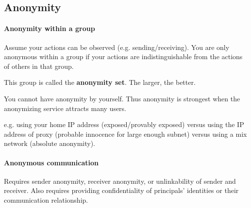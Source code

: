 \subsection{Anonymity}

\paragraph{Anonymity within a group} Assume your actions can be observed (e.g. sending/receiving). You are only anonymous within a group if your actions are indistinguishable from the actions of others in that group.

This group is called the \textbf{anonymity set}. The larger, the better.

You cannot have anonymity by yourself. Thus anonymity is strongest when the anonymizing service attracts many users.

\begin{center}
\end{center}

e.g. using your home IP address (exposed/provably exposed) versus using the IP address of proxy (probable innocence for large enough subnet) versus using a mix network (absolute anonymity).

\paragraph{Anonymous communication} Requires sender anonymity, receiver anonymity, or unlinkability of sender and receiver.
Also requires providing confidentiality of principals’ identities or their communication relationship.

